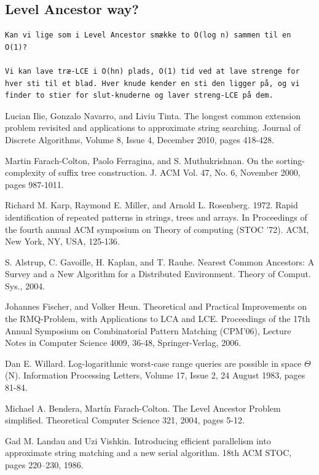 \documentclass[a4]{article}
\begin{document}
\subsection{Level Ancestor way?}

\begin{verbatim}
Kan vi lige som i Level Ancestor smække to O(log n) sammen til en O(1)?

Vi kan lave træ-LCE i O(hn) plads, O(1) tid ved at lave strenge for hver sti til et blad. Hver knude kender en sti den ligger på, og vi finder to stier for slut-knuderne og laver streng-LCE på dem.
\end{verbatim}

\fi %

\begin{thebibliography}{9}

 Lucian Ilie, Gonzalo Navarro, and Liviu Tinta. The longest common extension problem revisited and applications to approximate string searching. Journal of Discrete Algorithms, Volume 8, Issue 4, December 2010, pages 418-428.


 Martin Farach-Colton, Paolo Ferragina, and S. Muthukrishnan. On the sorting-complexity of suffix tree construction. J. ACM Vol. 47, No. 6, November 2000, pages 987-1011.

 Richard M. Karp, Raymond E. Miller, and Arnold L. Rosenberg. 1972. Rapid identification of repeated patterns in strings, trees and arrays. In Proceedings of the fourth annual ACM symposium on Theory of computing (STOC '72). ACM, New York, NY, USA, 125-136.

 S. Alstrup, C. Gavoille, H. Kaplan, and T. Rauhe. Nearest Common Ancestors: A Survey and a New Algorithm for a Distributed Environment. Theory of Comput. Sys., 2004.

 Johannes Fischer, and Volker Heun. Theoretical and Practical Improvements on the RMQ-Problem, with Applications to LCA and LCE. Proceedings of the 17th Annual Symposium on Combinatorial Pattern Matching (CPM'06), Lecture Notes in Computer Science 4009, 36-48, Springer-Verlag, 2006.

 Dan E. Willard. Log-logarithmic worst-case range queries are possible in space $\Theta$(N). Information Processing Letters, Volume 17, Issue 2, 24 August 1983, pages 81-84.

 Michael A. Bendera, Martín Farach-Colton. The Level Ancestor Problem simplified. Theoretical Computer Science 321, 2004, pages 5-12.

 Gad M. Landau and Uzi Vishkin. Introducing efficient parallelism into approximate string matching and a new serial algorithm. 18th ACM STOC, pages 220–230, 1986.

\end{thebibliography}
\end{document}
